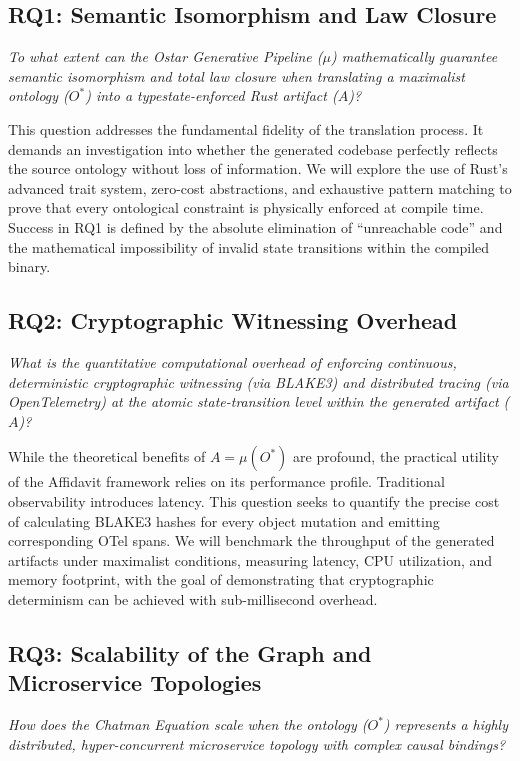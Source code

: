 \subsection{RQ1: Semantic Isomorphism and Law Closure}
\textit{To what extent can the Ostar Generative Pipeline ($\mu$) mathematically guarantee semantic isomorphism and total law closure when translating a maximalist ontology ($O^*$) into a typestate-enforced Rust artifact ($A$)?}

This question addresses the fundamental fidelity of the translation process. It demands an investigation into whether the generated codebase perfectly reflects the source ontology without loss of information. We will explore the use of Rust's advanced trait system, zero-cost abstractions, and exhaustive pattern matching to prove that every ontological constraint is physically enforced at compile time. Success in RQ1 is defined by the absolute elimination of ``unreachable code'' and the mathematical impossibility of invalid state transitions within the compiled binary.

\subsection{RQ2: Cryptographic Witnessing Overhead}
\textit{What is the quantitative computational overhead of enforcing continuous, deterministic cryptographic witnessing (via BLAKE3) and distributed tracing (via OpenTelemetry) at the atomic state-transition level within the generated artifact ($A$)?}

While the theoretical benefits of $A = \mu(O^*)$ are profound, the practical utility of the Affidavit framework relies on its performance profile. Traditional observability introduces latency. This question seeks to quantify the precise cost of calculating BLAKE3 hashes for every object mutation and emitting corresponding OTel spans. We will benchmark the throughput of the generated artifacts under maximalist conditions, measuring latency, CPU utilization, and memory footprint, with the goal of demonstrating that cryptographic determinism can be achieved with sub-millisecond overhead.

\subsection{RQ3: Scalability of the Graph and Microservice Topologies}
\textit{How does the Chatman Equation scale when the ontology ($O^*$) represents a highly distributed, hyper-concurrent microservice topology with complex causal bindings?}

